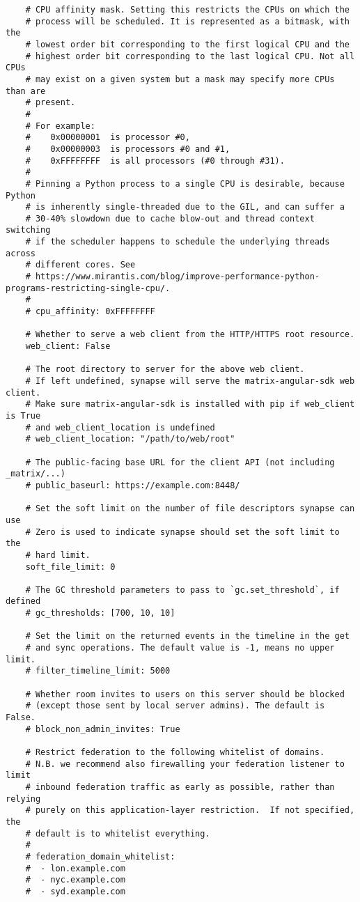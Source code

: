 \begin{lstlisting}
    # CPU affinity mask. Setting this restricts the CPUs on which the
    # process will be scheduled. It is represented as a bitmask, with the
    # lowest order bit corresponding to the first logical CPU and the
    # highest order bit corresponding to the last logical CPU. Not all CPUs
    # may exist on a given system but a mask may specify more CPUs than are
    # present.
    #
    # For example:
    #    0x00000001  is processor #0,
    #    0x00000003  is processors #0 and #1,
    #    0xFFFFFFFF  is all processors (#0 through #31).
    #
    # Pinning a Python process to a single CPU is desirable, because Python
    # is inherently single-threaded due to the GIL, and can suffer a
    # 30-40% slowdown due to cache blow-out and thread context switching
    # if the scheduler happens to schedule the underlying threads across
    # different cores. See
    # https://www.mirantis.com/blog/improve-performance-python-programs-restricting-single-cpu/.
    #
    # cpu_affinity: 0xFFFFFFFF
    
    # Whether to serve a web client from the HTTP/HTTPS root resource.
    web_client: False
    
    # The root directory to server for the above web client.
    # If left undefined, synapse will serve the matrix-angular-sdk web client.
    # Make sure matrix-angular-sdk is installed with pip if web_client is True
    # and web_client_location is undefined
    # web_client_location: "/path/to/web/root"
    
    # The public-facing base URL for the client API (not including _matrix/...)
    # public_baseurl: https://example.com:8448/
    
    # Set the soft limit on the number of file descriptors synapse can use
    # Zero is used to indicate synapse should set the soft limit to the
    # hard limit.
    soft_file_limit: 0
    
    # The GC threshold parameters to pass to `gc.set_threshold`, if defined
    # gc_thresholds: [700, 10, 10]
    
    # Set the limit on the returned events in the timeline in the get
    # and sync operations. The default value is -1, means no upper limit.
    # filter_timeline_limit: 5000
    
    # Whether room invites to users on this server should be blocked
    # (except those sent by local server admins). The default is False.
    # block_non_admin_invites: True
    
    # Restrict federation to the following whitelist of domains.
    # N.B. we recommend also firewalling your federation listener to limit
    # inbound federation traffic as early as possible, rather than relying
    # purely on this application-layer restriction.  If not specified, the
    # default is to whitelist everything.
    #
    # federation_domain_whitelist:
    #  - lon.example.com
    #  - nyc.example.com
    #  - syd.example.com
    

\end{lstlisting}
